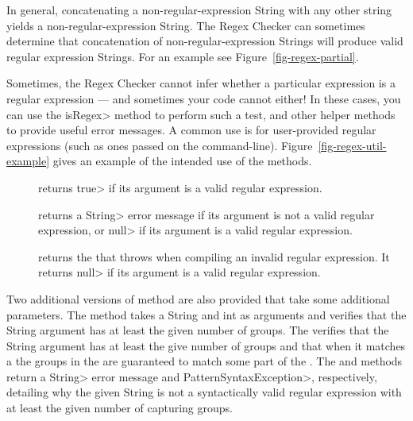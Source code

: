 In general, concatenating a non-regular-expression String with any other
string yields a non-regular-expression String.  The Regex Checker can
sometimes determine that concatenation of non-regular-expression Strings
will produce valid regular expression Strings. For an example see
Figure~\ref{fig-regex-partial}.



Sometimes, the Regex Checker cannot infer whether a particular expression
is a regular expression --- and sometimes your code cannot either! In
these cases, you can use the \<isRegex> method to perform such a test, and
other helper methods to provide useful error messages. A
common use is for user-provided regular expressions (such as ones passed
on the command-line).
Figure~\ref{fig-regex-util-example} gives an
example of the intended use of the  methods.

\begin{description}

\item[]
  returns \<true> if its argument is a valid regular expression.

\item[]
  returns a \<String> error message if its argument is not a valid regular
  expression, or \<null> if its argument is a valid regular expression.

\item[]
  returns the
  that 
  throws when compiling an invalid regular expression.  It returns \<null>
  if its argument is a valid regular expression.

\end{description}

Two additional versions of  method are also provided that take some additional
parameters. The 
method takes a String and int as arguments and
verifies that the String argument has at least the given number of groups. The
verifies that the String argument has at least the give number of groups and that when it
matches a  the groups in the  are guaranteed to match some
part of the . The
 and
methods return a \<String> error message and \<Pattern\-Syntax\-Exception>,
respectively, detailing why the given String is not a syntactically valid
regular expression with at least the given number of capturing groups.


